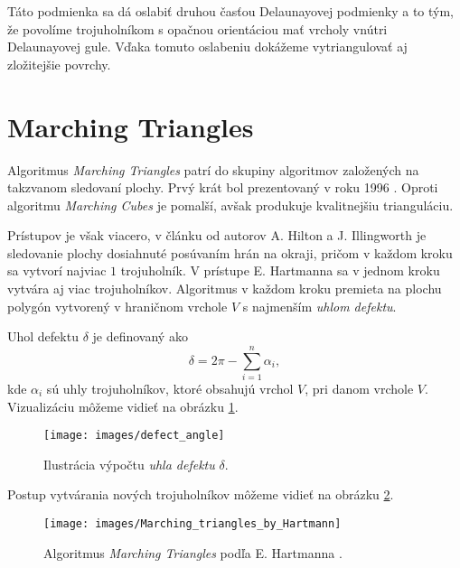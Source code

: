 Táto podmienka sa dá oslabiť druhou časťou
Delaunayovej podmienky a to tým, že povolíme trojuholníkom s opačnou orientáciou mať vrcholy vnútri
Delaunayovej gule. Vďaka tomuto oslabeniu dokážeme vytriangulovať aj zložitejšie povrchy.


\section{Marching Triangles}

\label{kap:marching_triangles}

Algoritmus \textit{Marching Triangles} patrí do skupiny algoritmov založených na takzvanom 
sledovaní plochy. Prvý krát bol prezentovaný v roku 1996 \cite{hilton1996marching}. 
Oproti algoritmu \textit{Marching Cubes} je pomalší, avšak produkuje kvalitnejšiu trianguláciu. 

Prístupov je však viacero, v článku od autorov A. Hilton a J. Illingworth \cite{hilton1996marching}
je sledovanie plochy dosiahnuté posúvaním hrán na okraji, pričom v každom kroku sa vytvorí 
najviac $1$ trojuholník. V prístupe E. Hartmanna \cite{hartmann1998marching} sa v jednom kroku 
vytvára aj viac trojuholníkov. Algoritmus v každom kroku premieta na plochu polygón vytvorený
v hraničnom vrchole $V$ s najmenším \textit{uhlom defektu}. 

\begin{definition}
    Uhol defektu $\delta$ je definovaný ako 
    $$ \delta = 2 \pi - \sum_{i=1}^{n} \alpha_i,$$
    kde $\alpha_i$ sú uhly trojuholníkov, ktoré obsahujú vrchol $V$, pri danom vrchole $V$.
    Vizualizáciu môžeme vidieť na obrázku \ref{obr:defect_angle}.
\end{definition}


\begin{figure}
    \centerline{\texttt{[image: images/defect\_angle]}}
    \caption[Uhol defektu]
    {Ilustrácia výpočtu \textit{uhla defektu} $\delta$.}
    \label{obr:defect_angle}
\end{figure}

Postup vytvárania nových trojuholníkov môžeme vidieť na obrázku \ref{obr:Marching_triangles_by_Hartmann}.

\begin{figure}
    \centerline{\texttt{[image: images/Marching\_triangles\_by\_Hartmann]}}
    \caption[Algoritmus \textit{Marching Triangles} podľa E. Hartmanna]
    {Algoritmus \textit{Marching Triangles} podľa E. Hartmanna \cite{hartmann1998marching}.}
    \label{obr:Marching_triangles_by_Hartmann}
\end{figure}

